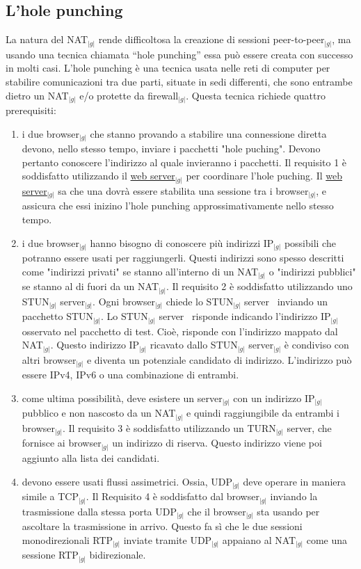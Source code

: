 {	\subsection{L’hole punching}{
		La natura del NAT$_{|g|}$ rende difficoltosa la creazione di sessioni peer-to-peer$_{|g|}$, ma usando una tecnica 
		chiamata “hole punching” essa può essere creata con successo in molti casi. L’hole punching è una tecnica 
		usata nelle reti di computer per stabilire comunicazioni tra due parti, situate in sedi differenti, 
		che sono entrambe dietro un NAT$_{|g|}$ e/o protette da firewall$_{|g|}$. Questa tecnica richiede quattro prerequisiti:
		\begin{enumerate}
			\item i due browser$_{|g|}$ che stanno provando a stabilire una connessione diretta devono, nello stesso tempo, 
			      inviare  i pacchetti "hole puching". Devono pertanto conoscere l’indirizzo al quale invieranno i pacchetti.
			      Il requisito 1 è soddisfatto utilizzando il \underline{web server}$_{|g|}$ per coordinare l'hole puching. 
			      Il \underline{web server}$_{|g|}$ sa che una dovrà essere stabilita una sessione tra i browser$_{|g|}$, 
			      e assicura che essi inizino l'hole punching approssimativamente nello stesso tempo.
			\item i due browser$_{|g|}$ hanno bisogno di conoscere più indirizzi IP$_{|g|}$ possibili che potranno essere 
			      usati per raggiungerli. Questi indirizzi sono spesso descritti come "indirizzi privati" se stanno 
			      all’interno di un NAT$_{|g|}$ o "indirizzi pubblici" se stanno al di fuori da un NAT$_{|g|}$. 
			      Il requisito 2 è soddisfatto utilizzando uno STUN$_{|g|}$ server$_{|g|}$. Ogni browser$_{|g|}$ chiede 
			      lo STUN$_{|g|}$ server\g~ inviando un pacchetto STUN$_{|g|}$. Lo STUN$_{|g|}$ server\g~ risponde indicando 
			      l'indirizzo IP$_{|g|}$ osservato nel pacchetto di test. Cioè, risponde con l'indirizzo mappato 
			      dal NAT$_{|g|}$. Questo indirizzo IP$_{|g|}$ ricavato dallo STUN$_{|g|}$ server$_{|g|}$ è condiviso 
			      con altri browser$_{|g|}$ e diventa un potenziale candidato di indirizzo. 
			      L’indirizzo può essere IPv4, IPv6 o una combinazione di entrambi.
			\item come ultima possibilità, deve esistere un server$_{|g|}$ con un indirizzo IP$_{|g|}$ pubblico e non 
			      nascosto da un NAT$_{|g|}$ e quindi raggiungibile da entrambi i browser$_{|g|}$. Il requisito 3 è 
			      soddisfatto utilizzando un TURN$_{|g|}$ server\g , che fornisce ai browser$_{|g|}$ un indirizzo di riserva. 
			      Questo indirizzo viene poi aggiunto alla lista dei candidati.
			\item devono essere usati flussi assimetrici. Ossia, UDP$_{|g|}$ deve operare in maniera simile a TCP$_{|g|}$. 
			      Il Requisito 4 è soddisfatto dal browser$_{|g|}$ inviando la trasmissione dalla stessa porta UDP$_{|g|}$ 
			      che il browser$_{|g|}$ sta usando per ascoltare la trasmissione in arrivo. 
			      Questo fa sì che le due sessioni monodirezionali RTP$_{|g|}$ inviate tramite UDP$_{|g|}$ appaiano al 
			      NAT$_{|g|}$ come una sessione RTP$_{|g|}$ bidirezionale.
		\end{enumerate}
	}
}